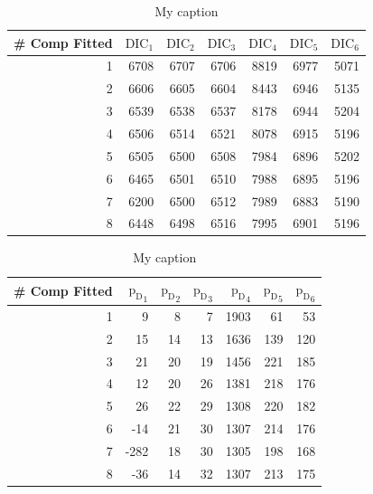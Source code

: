 \begin{table}[]
\centering
\caption{My caption}
\label{my-label}
\begin{tabular}{@{}rrrrrrr@{}}
\toprule
\# Comp Fitted & $\text{DIC}_1$ & $\text{DIC}_2$  & $\text{DIC}_3$  & $\text{DIC}_4$  & $\text{DIC}_5$  & $\text{DIC}_6$  \\ \midrule
1 & 6708 & 6707 & 6706 & 8819 & 6977 & 5071 \\
2 & 6606 & 6605 & 6604 & 8443 & 6946 & 5135 \\
3 & 6539 & 6538 & 6537 & 8178 & 6944 & 5204 \\
4 & 6506 & 6514 & 6521 & 8078 & 6915 & 5196 \\
5 & 6505 & 6500 & 6508 & 7984 & 6896 & 5202 \\
6 & 6465 & 6501 & 6510 & 7988 & 6895 & 5196 \\
7 & 6200 & 6500 & 6512 & 7989 & 6883 & 5190 \\
8 & 6448 & 6498 & 6516 & 7995 & 6901 & 5196 \\ \bottomrule
\end{tabular}

\begin{tabular}{@{}rrrrrrr@{}}
\toprule
\# Comp Fitted & ${\text{p}_\text{D}}_1$ & ${\text{p}_\text{D}}_2$ & ${\text{p}_\text{D}}_3$ & ${\text{p}_\text{D}}_4$ & ${\text{p}_\text{D}}_5$ & ${\text{p}_\text{D}}_6$ \\ \midrule
1 & 9 & 8 & 7 & 1903 & 61 & 53 \\
2 & 15 & 14 & 13 & 1636 & 139 & 120 \\
3 & 21 & 20 & 19 & 1456 & 221 & 185 \\
4 & 12 & 20 & 26 & 1381 & 218 & 176 \\
5 & 26 & 22 & 29 & 1308 & 220 & 182 \\
6 & -14 & 21 & 30 & 1307 & 214 & 176 \\
7 & -282 & 18 & 30 & 1305 & 198 & 168 \\
8 & -36 & 14 & 32 & 1307 & 213 & 175 \\ \bottomrule
\end{tabular}
\end{table}

